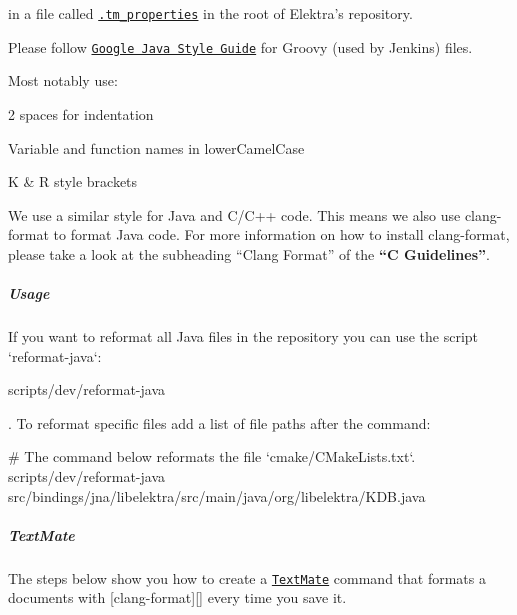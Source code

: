 in a file called \href{https://macromates.com/blog/2011/git-style-configuration}{\tt {\ttfamily .tm\+\_\+properties}} in the root of Elektra’s repository.

Please follow \href{https://google.github.io/styleguide/javaguide.html}{\tt Google Java Style Guide} for Groovy (used by Jenkins) files.

Most notably use\+:


\begin{DoxyItemize}
\item 2 spaces for indentation
\item Variable and function names in lower\+Camel\+Case
\item K \& R style brackets
\end{DoxyItemize}

We use a similar style for Java and C/\+C++ code. This means we also use {\ttfamily clang-\/format} to format Java code. For more information on how to install {\ttfamily clang-\/format}, please take a look at the subheading “\+Clang Format” of the {\bfseries “C Guidelines”}.

\label{invalid_invalid}%
%
\subparagraph*{Usage}

If you want to reformat all Java files in the repository you can use the script `reformat-\/java`\+:


\begin{DoxyCode}
scripts/dev/reformat-java
\end{DoxyCode}


. To reformat specific files add a list of file paths after the command\+:


\begin{DoxyCode}
# The command below reformats the file `cmake/CMakeLists.txt`.
scripts/dev/reformat-java src/bindings/jna/libelektra/src/main/java/org/libelektra/KDB.java
\end{DoxyCode}


\subparagraph*{Text\+Mate}

The steps below show you how to create a \href{https://macromates.com}{\tt Text\+Mate} command that formats a documents with \mbox{[}{\ttfamily clang-\/format}\mbox{]}\mbox{[}\mbox{]} every time you save it.


